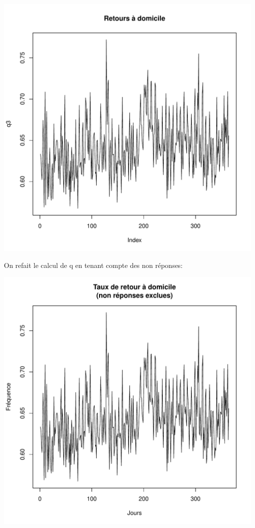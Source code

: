 \documentclass[12pt,english,french,twoside]{report}\usepackage[]{graphicx}\usepackage[]{color}
\makeatletter
\def\maxwidth{ %
  \ifdim\Gin@nat@width>\linewidth
    \linewidth
  \else
    \Gin@nat@width
  \fi
}
\newenvironment{kframe}{%
 \def\at@end@of@kframe{}%
 \ifinner\ifhmode%
  \def\at@end@of@kframe{\end{minipage}}%
  \begin{minipage}{\columnwidth}%
 \fi\fi%
 \def\FrameCommand##1{\hskip\@totalleftmargin \hskip-\fboxsep
 \colorbox{shadecolor}{##1}\hskip-\fboxsep
     \hskip-\linewidth \hskip-\@totalleftmargin \hskip\columnwidth}%
 \MakeFramed {\advance\hsize-\width
   \@totalleftmargin\z@ \linewidth\hsize
   \@setminipage}}%
 {\par\unskip\endMakeFramed%
 \at@end@of@kframe}
\makeatother
\begin{document}
\begin{kframe}


{\ttfamily\noindent\bfseries{}}\end{kframe}
\includegraphics[width=\maxwidth]{figure/retour_dom} 



On refait le calcul de q en tenant compte des non réponses:

\includegraphics[width=\maxwidth]{figure/retour_dom2} 
\end{document}
